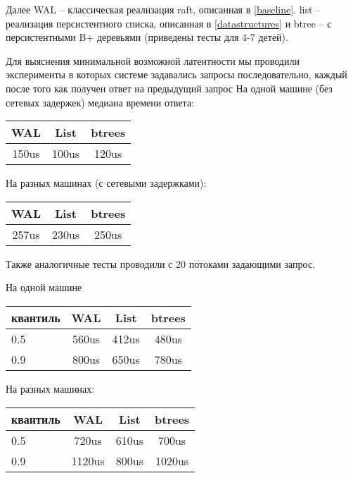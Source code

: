 \documentclass[pdftex,ptm,12pt,a4paper]{report}
\theoremstyle{definition}
\begin{document}
Далее  WAL -- классическая реализация raft, описанная в \ref{baseline}. list -- реализация персистентного списка, описанная в \ref{datastructures}
и btree -- с персистентными B+ деревьями (приведены тесты для 4-7 детей).

Для выяснения минимальной возможной латентности мы проводили эксперименты в которых системе задавались запросы последовательно, каждый после того как получен ответ на предыдущий запрос
На одной машине (без сетевых задержек) медиана времени ответа:
\begin{center}
\begin{tabular} {|c c c|}
\hline
    WAL & List & btrees \\
    \hline
150us & 100us & 120us \\
\hline
\end{tabular}
\end{center}

На разных машинах (с сетевыми задержками):
\begin{center}
\begin{tabular} {|c c c|}
\hline
    WAL & List & btrees \\
    \hline
257us & 230us & 250us \\
\hline
\end{tabular}
\end{center}

Также аналогичные тесты проводили с 20 потоками задающими запрос.

На одной машине

\begin{center}
\begin{tabular} {|l |c c c|}
\hline
квантиль & WAL & List & btrees \\
\hline
0.5 & 560us & 412us & 480us \\
0.9 & 800us & 650us & 780us \\
\hline
\end{tabular}
\end{center}

На разных машинах:

\begin{center}
\begin{tabular} {|l |c c c|}
\hline
квантиль & WAL & List & btrees \\
\hline
0.5 & 720us & 610us & 700us \\
0.9 & 1120us & 800us & 1020us \\
\hline
\end{tabular}
\end{center}
\end{document}
